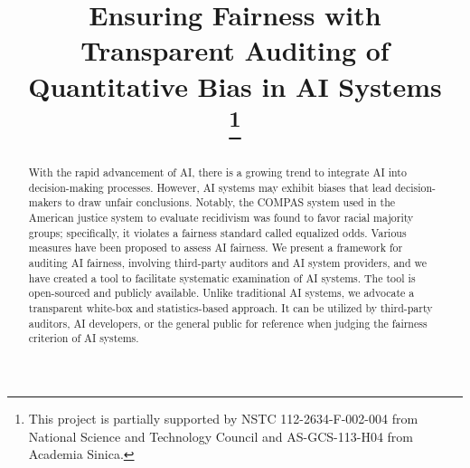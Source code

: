 \documentclass[conference]{IEEEtran}
\begin{document}
\title{Ensuring Fairness with Transparent Auditing of Quantitative Bias in AI Systems\\
\thanks{This project is partially supported by NSTC 112-2634-F-002-004 from National Science and Technology Council and AS-GCS-113-H04 from Academia Sinica.}
}

\DeclarePairedDelimiter{\set}{\{}{\}}
\DeclarePairedDelimiter{\tuple}{(}{)}
\DeclarePairedDelimiter{\abs}{\lvert}{\rvert}

\renewcommand{\implies}{\rightarrow}

\newcommand{\db}{\mathcal{D}}
\newcommand{\model}{\mathcal{M}}
\newcommand{\priv}{R}
\newcommand{\pos}{\hat{P}}
\newcommand{\posm}{\hat{P}_\mathcal{M}}
\newcommand{\tru}{T}
\newcommand{\leg}{L}
\newcommand{\sco}{\hat{S}}
\newcommand{\scom}{\hat{S}_\mathcal{M}}
\newcommand{\calib}{C}

\newcommand{\bye}[1]{}

\author{
\and
{}
}

\maketitle

\begin{abstract}
With the rapid advancement of AI, there is a growing trend to integrate AI into decision-making processes. However, AI systems may exhibit biases that lead decision-makers to draw unfair conclusions. Notably, the COMPAS system used in the American justice system to evaluate recidivism was found to favor racial majority groups; specifically, it violates a fairness standard called equalized odds. Various measures have been proposed to assess AI fairness. We present a framework for auditing AI fairness, involving third-party auditors and AI system providers, and we have created a tool to facilitate systematic examination of AI systems. The tool is open-sourced and publicly available. Unlike traditional AI systems, we advocate a transparent white-box and statistics-based approach. It can be utilized by third-party auditors, AI developers, or the general public for reference when judging the fairness criterion of AI systems.
\end{abstract}
\end{document}
